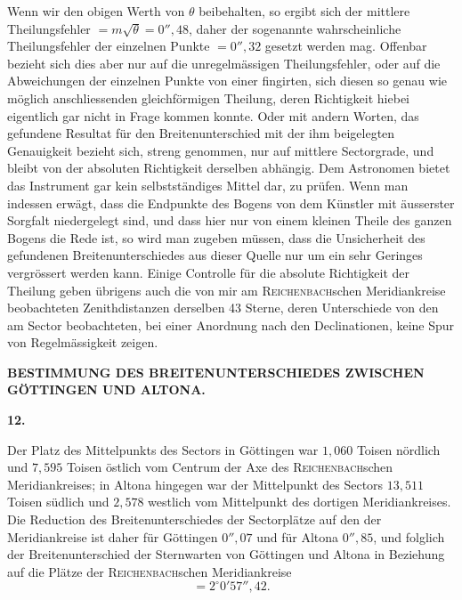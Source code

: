 Wenn wir den obigen Werth von \(\theta\) beibehalten, so ergibt sich der mittlere
Theilungsfehler \(=m\surd\theta=0''{,}48\), daher der sogenannte wahrscheinliche
Theilungsfehler der einzelnen Punkte \(=0''{,}32\) gesetzt werden mag. Offenbar
bezieht sich dies aber nur auf die unregelmässigen Theilungsfehler, oder auf
die Abweichungen der einzelnen Punkte von einer fingirten, sich diesen so
genau wie möglich anschliessenden gleichförmigen Theilung, deren
 Richtigkeit hiebei eigentlich gar nicht in Frage kommen konnte.
Oder mit andern Worten, das gefundene Resultat für den Breitenunterschied mit
der ihm beigelegten Genauigkeit bezieht sich, streng genommen, nur auf mittlere
Sectorgrade, und bleibt von der absoluten Richtigkeit derselben abhängig.
Dem Astronomen bietet das Instrument gar kein selbstständiges Mittel dar,
 zu prüfen. Wenn man indessen erwägt, dass die Endpunkte des Bogens
von dem Künstler mit äusserster Sorgfalt niedergelegt sind, und dass hier nur
von einem kleinen Theile des ganzen Bogens die Rede ist, so wird man
zugeben müssen, dass die Unsicherheit des gefundenen Breitenunterschiedes aus
dieser Quelle nur um ein sehr Geringes vergrössert werden kann. Einige
Controlle für die absolute Richtigkeit der Theilung geben übrigens auch die
von mir am \textsc{Reichenbach}schen Meridiankreise beobachteten Zenithdistanzen
derselben 43 Sterne, deren Unterschiede von den am Sector beobachteten, bei
einer Anordnung nach den Declinationen, keine Spur von Regelmässigkeit
zeigen.

\par\clearpage
\noindent{}\parbox[t]{\dimexpr\linewidth-24mm\relax}{\centering\scriptsize\bfseries BESTIMMUNG DES BREITENUNTERSCHIEDES ZWISCHEN GÖTTINGEN UND ALTONA.}\makebox[12mm][r]{}\par\medskip

\begin{center}\textbf{12.}\end{center}

Der Platz des Mittelpunkts des Sectors in Göttingen war \(1{,}060\) Toisen
nördlich und \(7{,}595\) Toisen östlich vom Centrum der Axe des \textsc{Reichenbach}schen
Meridiankreises; in Altona hingegen war der Mittelpunkt des Sectors \(13{,}511\)
Toisen südlich und \(2{,}578\) westlich vom Mittelpunkt des dortigen
Meridiankreises. Die Reduction des Breitenunterschiedes der Sectorplätze auf den der
Meridiankreise ist daher für Göttingen \(0''{,}07\) und für Altona \(0''{,}85\), und folglich
der Breitenunterschied der Sternwarten von Göttingen und Altona in
Beziehung auf die Plätze der \textsc{Reichenbach}schen Meridiankreise
\[
=2^\circ0'57''{,}42.
\]

